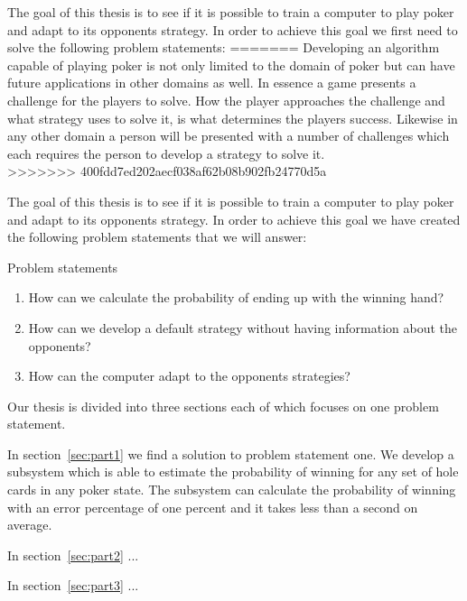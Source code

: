 The goal of this thesis is to see if it is possible to train a computer to play poker and adapt to its opponents strategy. In order to achieve this goal we first need to solve the following problem statements:
=======
Developing an algorithm capable of playing poker is not only limited to the domain of poker but can have future applications in other domains as well. In essence a game presents a challenge for the players to solve. How the player approaches the challenge and what strategy uses to solve it, is what determines the players success. Likewise in any other domain a person will be presented with a number of challenges which each requires the person to develop a strategy to solve it.\\
>>>>>>> 400fdd7ed202aecf038af62b08b902fb24770d5a

The goal of this thesis is to see if it is possible to train a computer to play poker and adapt to its opponents strategy. In order to achieve this goal we have created the following problem statements that we will answer:

\vspace{4mm}
\begin{statementBox2}{Problem statements}
\begin{enumerate}
    \item \label{itm:q1} How can we calculate the probability of ending up with the winning hand? 
    \item \label{itm:q2} How can we develop a default strategy without having information about the opponents? 
    \item \label{itm:q3} How can the computer adapt to the opponents strategies?
  \end{enumerate}
\end{statementBox2}
\vspace{4mm}

Our thesis is divided into three sections each of which focuses on one problem statement.

In section~\ref{sec:part1} we find a solution to problem statement one. We develop a subsystem which is able to estimate the probability of winning for any set of hole cards in any poker state. The subsystem can calculate the probability of winning with an error percentage of one percent and it takes less than a second on average.

In section~\ref{sec:part2} ...

In section~\ref{sec:part3} ...
